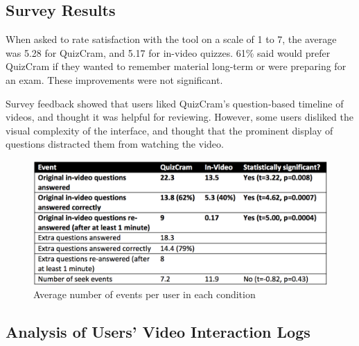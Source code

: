 \documentclass{sigchi}
\begin{document}

\subsection{Survey Results}

When asked to rate satisfaction with the tool on a scale of 1 to 7, the average was 5.28 for QuizCram, and 5.17 for in-video quizzes.  61\% said would prefer QuizCram if they wanted to remember material long-term or were preparing for an exam. These improvements were not significant.

Survey feedback showed that users liked QuizCram's question-based timeline of videos, and thought it was helpful for reviewing. However, some users disliked the visual complexity of the interface, and thought that the prominent display of questions distracted them from watching the video.

\begin{figure}
\centering
\includegraphics[width=1.0\columnwidth]{event-logs}
\caption{Average number of events per user in each condition}
\label{fig:event-logs}
\end{figure}

\subsection{Analysis of Users' Video Interaction Logs}
\end{document}
